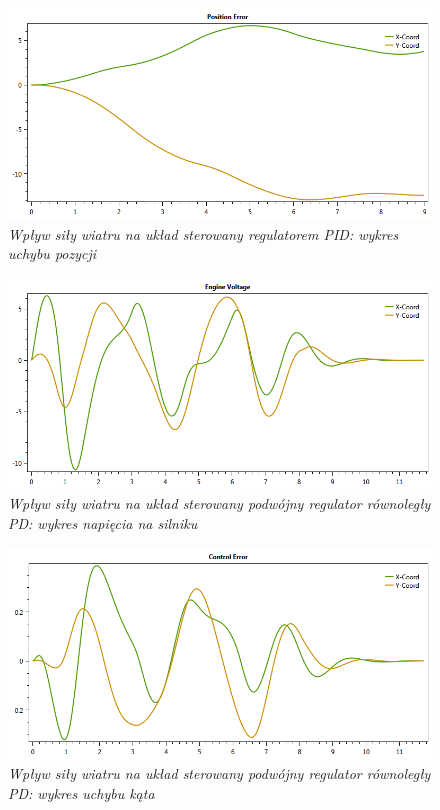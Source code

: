 \documentclass[12pt, oneside]{report}
\theoremstyle{definition}
\begin{document}
\begin{figure}[H]
	\centering
		\includegraphics[width = 320pt]{WindPIDCEP} 
		\caption{\textit{Wpływ siły wiatru na układ sterowany regulatorem PID: wykres uchybu pozycji}}
		\label{plot:WindPIDCEP}
\end{figure}


\begin{figure}[H]
	\centering
		\includegraphics[width = 320pt]{WindPDEV} 
		\caption{\textit{Wpływ siły wiatru na układ sterowany podwójny regulator równoległy PD: wykres napięcia na silniku}}
		\label{plot:WindPDEV}
\end{figure}

\begin{figure}[H]
	\centering
		\includegraphics[width = 320pt]{WindPDCEA} 
		\caption{\textit{Wpływ siły wiatru na układ sterowany podwójny regulator równoległy PD: wykres uchybu kąta}}
		\label{plot:WindPDCEA}
\end{figure}
\end{document}
